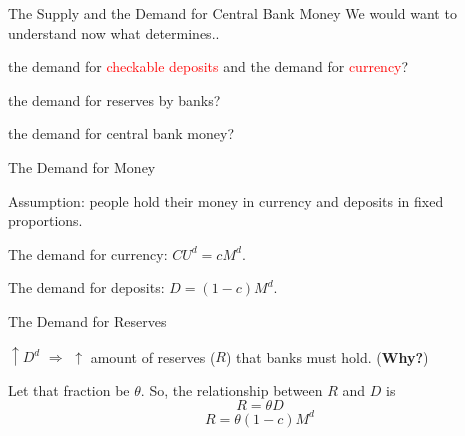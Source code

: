 \documentclass[shownotes,11pt, aspectratio=169]{beamer}
\newenvironment{wideitemize}{\itemize\addtolength{\itemsep}{10pt}}{\enditemize}
\begin{document}
\begin{frame}{The Supply and the Demand for Central Bank Money}
We would want to understand now what determines..
\begin{wideitemize}
\item the demand for \textcolor{red}{checkable deposits} and the demand for \textcolor{red}{currency}?
\item the demand for reserves by banks?
\item the demand for central bank money?
\end{wideitemize}
\end{frame}

\begin{frame}
\end{frame}

\begin{frame}{The Demand for Money}
\begin{wideitemize}
\item Assumption: people hold their money in currency and deposits in fixed proportions.
\pause
\item The demand for currency: $CU^d = cM^d$.
\pause
\item The demand for deposits: $D = (1 - c)M^d$.
\end{wideitemize}
\end{frame}

\begin{frame}{The Demand for Reserves}
\begin{wideitemize}
\item $\uparrow D^d$ $\Rightarrow$ $\uparrow$ amount of reserves ($R$) that banks must hold. (\textbf{Why?})
\item Let that fraction be $\theta$. So, the relationship between $R$ and $D$ is
     \[ R = \theta D \]
     \pause
     \[ R = \theta (1 - c)M^d \]
\end{wideitemize}
\end{frame}
\end{document}
